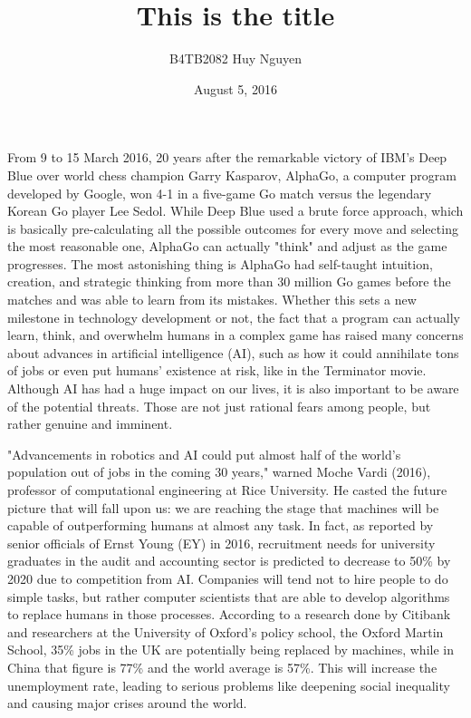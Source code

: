 \documentclass[12pt,a4paper]{article}
\title{This is the title}
\author{B4TB2082 Huy Nguyen}
\date{August 5, 2016}
\begin{document}
\maketitle{}
From 9 to 15 March 2016, 20 years after the remarkable victory of IBM's Deep Blue over world chess champion Garry Kasparov, AlphaGo, a computer program developed by Google, won 4-1 in a five-game Go match versus the legendary Korean Go player Lee Sedol. While Deep Blue used a brute force approach, which is basically pre-calculating all the possible outcomes for every move and selecting the most reasonable one, AlphaGo can actually "think" and adjust as the game progresses. The most astonishing thing is AlphaGo had self-taught intuition, creation, and strategic thinking from more than 30 million Go games before the matches and was able to learn from its mistakes. Whether this sets a new milestone in technology development or not, the fact that a program can actually learn, think, and overwhelm humans in a complex game has raised many concerns about advances in artificial intelligence (AI), such as how it could annihilate tons of jobs or even put humans' existence at risk, like in the Terminator movie. Although AI has had a huge impact on our lives, it is also important to be aware of the potential threats. Those are not just rational fears among people, but rather genuine and imminent.

"Advancements in robotics and AI could put almost half of the world's population out of jobs in the coming 30 years," warned Moche Vardi (2016), professor of computational engineering at Rice University. He casted the future picture that will fall upon us: we are reaching the stage that machines will be capable of outperforming humans at almost any task. In fact, as reported by senior officials of Ernst  Young (EY) in 2016, recruitment needs for university graduates in the audit and accounting sector is predicted to decrease to 50\% by 2020 due to competition from AI. Companies will tend not to hire people to do simple tasks, but rather computer scientists that are able to develop algorithms to replace humans in those processes. According to a research done by Citibank and researchers at the University of Oxford's policy school, the Oxford Martin School, 35\% jobs in the UK are potentially being replaced by machines, while in China that figure is 77\% and the world average is 57\%. This will increase the unemployment rate, leading to serious problems like deepening social inequality and causing major crises around the world.
\end{document}
